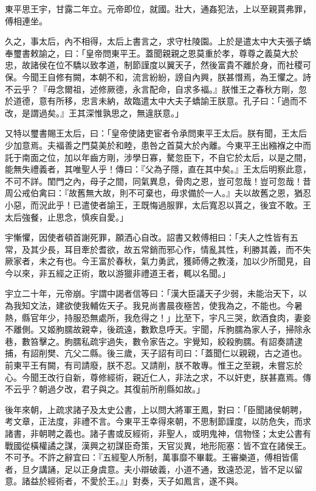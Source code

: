 \begin{pinyinscope}
東平思王宇，甘露二年立。元帝即位，就國。壯大，通姦犯法，上以至親貰弗罪，傅相連坐。

久之，事太后，內不相得，太后上書言之，求守杜陵園。上於是遣太中大夫張子蟜奉璽書敕諭之，曰：「皇帝問東平王。蓋聞親親之恩莫重於孝，尊尊之義莫大於忠，故諸侯在位不驕以致孝道，制節謹度以翼天子，然後富貴不離於身，而社稷可保。今聞王自修有闕，本朝不和，流言紛紛，謗自內興，朕甚憯焉，為王懼之。詩不云乎？『毋念爾祖，述修厥德，永言配命，自求多褔。』朕惟王之春秋方剛，忽於道德，意有所移，忠言未納，故臨遣太中大夫子蟜諭王朕意。孔子曰：「過而不改，是謂過矣。』王其深惟孰思之，無違朕意。」

又特以璽書賜王太后，曰：「皇帝使諸吏宦者令承問東平王太后。朕有聞，王太后少加意焉。夫褔善之門莫美於和睦，患咎之首莫大於內離。今東平王出繈褓之中而託于南面之位，加以年齒方剛，涉學日寡，驁忽臣下，不自它於太后，以是之間，能無失禮義者，其唯聖人乎！傳曰：『父為子隱，直在其中矣。』王太后明察此意，不可不詳。閨門之內，母子之間，同氣異息，骨肉之恩，豈可忽哉！豈可忽哉！昔周公戒伯禽曰：『故舊無大故，則不可棄也，毋求備於一人。』夫以故舊之恩，猶忍小惡，而況此乎！已遣使者諭王，王既悔過服罪，太后寬忍以貰之，後宜不敢。王太后強餐，止思念，慎疾自愛。」

宇慚懼，因使者頓首謝死罪，願洒心自改。詔書又敕傅相曰：「夫人之性皆有五常，及其少長，耳目牽於耆欲，故五常銷而邪心作，情亂其性，利勝其義，而不失厥家者，未之有也。今王富於春秋，氣力勇武，獲師傅之教淺，加以少所聞見，自今以來，非五經之正術，敢以游獵非禮道王者，輒以名聞。」

宇立二十年，元帝崩。宇謂中謁者信等曰：「漢大臣議天子少弱，未能治天下，以為我知文法，建欲使我輔佐天子。我見尚書晨夜極苦，使我為之，不能也。今暑熱，縣官年少，持服恐無處所，我危得之！」比至下，宇凡三哭，飲酒食肉，妻妾不離側。又姬朐臑故親幸，後疏遠，數歎息呼天。宇聞，斥朐臑為家人子，掃除永巷，數笞擊之。朐臑私疏宇過失，數令家告之。宇覺知，絞殺朐臑。有詔奏請逮捕，有詔削樊、亢父二縣。後三歲，天子詔有司曰：「蓋聞仁以親親，古之道也。前東平王有闕，有司請廢，朕不忍。又請削，朕不敢專。惟王之至親，未嘗忘於心。今聞王改行自新，尊修經術，親近仁人，非法之求，不以奸吏，朕甚嘉焉。傳不云乎？朝過夕改，君子與之。其復前所削縣如故。」

後年來朝，上疏求諸子及太史公書，上以問大將軍王鳳，對曰：「臣聞諸侯朝聘，考文章，正法度，非禮不言。今東平王幸得來朝，不思制節謹度，以防危失，而求諸書，非朝聘之義也。諸子書或反經術，非聖人，或明鬼神，信物怪；太史公書有戰國從橫權譎之謀，漢興之初謀臣奇策，天官災異，地形阨塞：皆不宜在諸侯王。不可予。不許之辭宜曰：『五經聖人所制，萬事靡不畢載。王審樂道，傅相皆儒者，旦夕講誦，足以正身虞意。夫小辯破義，小道不通，致遠恐泥，皆不足以留意。諸益於經術者，不愛於王。』」對奏，天子如鳳言，遂不與。


\end{pinyinscope}
